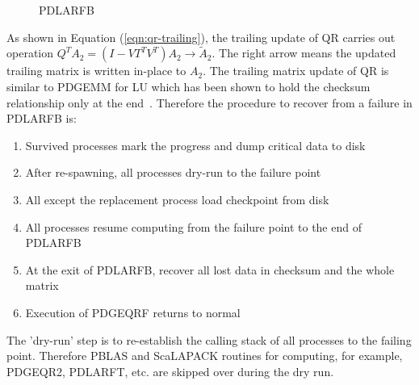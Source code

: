 \begin{figure}[b]
	\centering
	\caption{PDLARFB}
\end{figure}

As shown in Equation (\ref{eqn:qr-trailing}), the trailing update of QR carries
out operation $Q^{T}A_{2}=(I-VT^{T}V^{T})A_{2}\rightarrow
\tilde{A}_{2}$. The right arrow means the updated trailing matrix is
written in-place to $A_{2}$. The trailing matrix update of QR is
similar to PDGEMM for LU which has been shown to hold the checksum
relationship only at the end~\cite{lawn253}. Therefore the procedure
to recover from a failure in PDLARFB is:
\begin{enumerate}
\item Survived processes mark the progress and dump critical data to disk 
\item After re-spawning, all processes dry-run to the failure point
\item All except the replacement process load checkpoint from disk 
\item All processes resume computing from the failure point to the end of PDLARFB
\item At the exit of PDLARFB, recover all lost data in checksum and the whole matrix
\item Execution of PDGEQRF returns to normal
\end{enumerate}
The 'dry-run' step is to re-establish the calling stack of all processes to
the failing point. Therefore PBLAS and ScaLAPACK routines for
computing, for example, PDGEQR2, PDLARFT, etc. are skipped over during 
the dry run.

